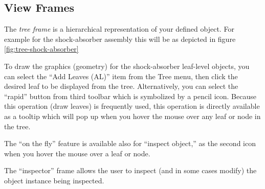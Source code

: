 \documentclass [11pt]{book}
\begin{document}
\subsection{View Frames}

\label{subsec:viewframes}



The \emph{tree frame} is a hierarchical representation of your defined
object. For example for the shock-absorber assembly this will be as
depicted in figure 
\ref{fig:tree-shock-absorber}



To draw the graphics (geometry) for the shock-absorber
leaf-level objects, you can select the ``Add Leaves (AL)'' item from
the Tree menu, then click the desired leaf to be displayed from the
tree. Alternatively, you can select the ``rapid'' button from third
toolbar which is symbolized by a pencil icon. Because this
operation (draw leaves) is frequently used, this operation is directly
available as a tooltip which will pop up when you hover the mouse over
any leaf or node in the tree.



The ``on the fly'' feature is available also for ``inspect
object,'' as the second icon when you hover the mouse over a leaf or
node.



The ``inspector'' frame allows the user to inspect (and in
some cases modify) the object instance being inspected.
\end{document}
